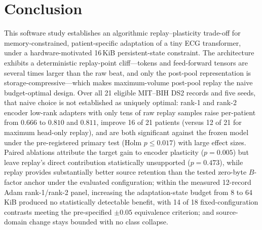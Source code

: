 \section{Conclusion}
\label{sec:conclusion}

This software study establishes an algorithmic replay--plasticity trade-off for
memory-constrained, patient-specific adaptation of a tiny ECG transformer, under
a hardware-motivated 16\,KiB persistent-state constraint. The architecture
exhibits a deterministic replay-point cliff---tokens and feed-forward tensors
are several times larger than the raw beat, and only the post-pool
representation is storage-com\-pres\-sive---which makes maximum-volume post-pool
replay the naive budget-optimal design. Over all 21 eligible MIT--BIH DS2
records and five seeds, that naive choice is not established as uniquely optimal:
rank-1 and
rank-2 encoder low-rank adapters with only tens of raw replay samples raise
per-patient \macrof{} from $0.666$ to $0.810$ and $0.811$, improve 16 of 21
patients (versus 12 of 21 for maximum head-only replay), and are both
significant against the frozen model under the pre-registered primary test
(Holm $p\le0.017$) with large effect sizes.
Paired ablations attribute the target gain to encoder plasticity ($p = 0.005$)
but leave replay's direct contribution statistically unsupported ($p = 0.473$),
while replay provides substantially better source retention than the tested
zero-byte $B$-factor anchor under the evaluated configuration; within the
measured 12-record Adam rank-1/rank-2 panel, increasing the adaptation-state
budget from 8 to 64\,KiB produced no statistically detectable benefit, with 14 of
18 fixed-configuration contrasts meeting the pre-specified $\pm 0.05$ equivalence
criterion; and source-domain change stays bounded with no class collapse.

